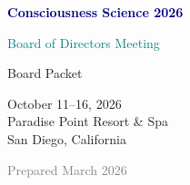 \documentclass[11pt,letterpaper]{article}
\begin{document}
\vspace*{\fill}

\begin{center}

{\Huge\bfseries\textcolor{navy}{Consciousness Science 2026}}

\bigskip

{\Large\textcolor{teal}{Board of Directors Meeting}}

\bigskip

{\large Board Packet}

\vspace{2cm}

{\normalsize
October 11--16, 2026\\
Paradise Point Resort \& Spa\\
San Diego, California
}

\vspace{1.5cm}

{\small\textcolor{gray}{Prepared March 2026}}

\end{center}

\vspace*{\fill}
\end{document}
